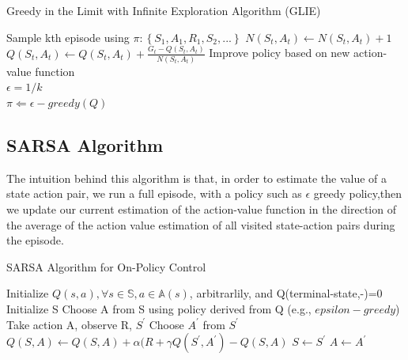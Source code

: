 \documentclass[12pt,a4paper]{article}
\begin{document}
\begin{algorithm}
\caption{Greedy in the Limit with Infinite Exploration Algorithm (GLIE)}
\label{alg:glie}
\begin{algorithmic}[1]
\State Sample kth episode using $\pi: \left\{S_{1}, A_{1}, R_{1}, S_{2}, ...\right\}$
\State $N(S_{t}, A_{t}) \leftarrow N(S_{t}, A_{t}) + 1$
\State $Q(S_{t}, A_{t}) \leftarrow Q(S_{t}, A_{t}) + \frac{G_{t} - Q(S_{t}, A_{t})}{N(S_{t}, A_{t})}$
\EndFor
\State Improve policy based on new action-value function
\\ $\epsilon = 1/k $
\\ $\pi \Leftarrow \epsilon-greedy(Q) $
\end{algorithmic}
\end{algorithm}


\subsection{SARSA Algorithm}


The intuition behind this algorithm is that, in order to estimate the value of a state action pair, we run a full episode, with a policy such as $\epsilon$ greedy policy,then we update our current estimation of the action-value function in the direction of the average of the action value estimation of all visited state-action pairs during the episode.


\begin{algorithm}
\caption{SARSA Algorithm for On-Policy Control}
\label{alg:sarsa}
\begin{algorithmic}[1]
\State Initialize $Q(s,a),\forall s \in \mathbb{S}, a \in \mathbb{A}(s)$, arbitrarlily, and Q(terminal-state,-)=0
\State Initialize S
\State Choose A from S using policy derived from Q (e.g., $epsilon-greedy$)
\State Take action A, observe R, $S^{\prime}$
\State Choose $A^{\prime}$ from $S^{\prime}$
\State $Q(S,A) \leftarrow Q(S,A) + \alpha(R + \gamma Q(S^{\prime}, A^{\prime}) - Q(S, A)$
\State $S \leftarrow S^{\prime}$
\State $A \leftarrow A^{\prime}$
\EndFor
\EndFor
\end{algorithmic}
\end{algorithm}
\end{document}
